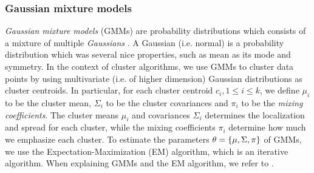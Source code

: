 \subsubsection{Gaussian mixture models}
\label{sec:gmm-clustering}
\textit{Gaussian mixture models} (GMMs) are probability distributions which consists of a mixture of multiple \textit{Gaussians} \cite[Section 9.2]{bishop2006}. A Gaussian (i.e. normal) is a probability distribution which was several nice properties, such as mean as its mode and symmetry. In the context of cluster algorithms, we use GMMs to cluster data points by using multivariate (i.e. of higher dimension) Gaussian distributions as cluster centroids. In particular, for each cluster centroid $c_i, 1 \leq i \leq k$, we define $\mu_i$ to be the cluster mean, $\Sigma_i$ to be the cluster covariances and $\pi_i$ to be the \textit{mixing coefficients}. The cluster means $\mu_i$ and covariances $\Sigma_i$ determines the localization and spread for each cluster, while the mixing coefficients $\pi_i$ determine how much we emphasize each cluster. To estimate the parameters $\theta = \left\{\mu, \Sigma, \pi\right\}$ of GMMs, we use the Expectation-Maximization (EM) algorithm, which is an iterative algorithm. When explaining GMMs and the EM algorithm, we refer to \cite[Section 9.2]{bishop2006}.

